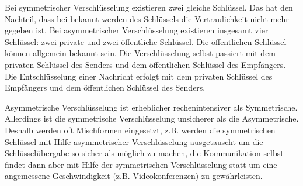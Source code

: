 \begin{answer}
Bei symmetrischer Verschlüsselung existieren zwei gleiche Schlüssel. Das hat den Nachteil, dass bei bekannt werden des Schlüssels die Vertraulichkeit nicht mehr gegeben ist.
Bei asymmetrischer Verschlüsselung existieren insgesamt vier Schlüssel: zwei private und zwei öffentliche Schlüssel. Die öffentlichen Schlüssel können allgemein bekannt sein. Die Verschlüsselung selbst passiert mit dem privaten Schlüssel des Senders und dem öffentlichen Schlüssel des Empfängers.
Die Entschlüsselung einer Nachricht erfolgt mit dem privaten Schlüssel des Empfängers und dem
öffentlichen Schlüssel des Senders.

Asymmetrische Verschlüsselung ist erheblicher rechenintensiver als Symmetrische. Allerdings ist die
symmetrische Verschlüsselung unsicherer als die Asymmetrische. Deshalb werden oft Mischformen
eingesetzt, z.B. werden die symmetrischen Schlüssel mit Hilfe asymmetrischer Verschlüsselung ausgetauscht
um die Schlüsselübergabe so sicher als möglich zu machen, die Kommunikation selbst
findet dann aber mit Hilfe der symmetrischen Verschlüsselung statt um eine angemessene Geschwindigkeit
(z.B. Videokonferenzen) zu gewährleisten.
\end{answer}